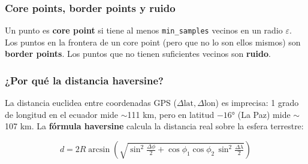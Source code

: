 \documentclass[12pt,a4paper]{article}
\begin{document}
\subsubsection{Core points, border points y ruido}

\begin{center}
\end{center}

Un punto es \textbf{core point} si tiene al menos \texttt{min\_samples}
vecinos en un radio $\varepsilon$.
Los puntos en la frontera de un core point (pero que no lo son ellos mismos)
son \textbf{border points}.
Los puntos que no tienen suficientes vecinos son \textbf{ruido}.

\subsubsection{¿Por qué la distancia haversine?}

La distancia euclidea entre coordenadas GPS ($\Delta\text{lat}, \Delta\text{lon}$)
es imprecisa: 1 grado de longitud en el ecuador mide $\sim$111 km, pero en
latitud $-16°$ (La Paz) mide $\sim$107 km.
La \textbf{fórmula haversine} calcula la distancia real sobre la esfera
terrestre:

\begin{equation}
  d = 2R\arcsin\!\left(\sqrt{
    \sin^2\!\tfrac{\Delta\phi}{2} +
    \cos\phi_1\cos\phi_2\,\sin^2\!\tfrac{\Delta\lambda}{2}
  }\right)
\end{equation}
\end{document}
